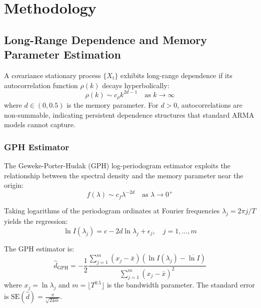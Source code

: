 \documentclass[12pt,a4paper]{article}
\begin{document}
\section{Methodology}
\label{sec:methodology}

\subsection{Long-Range Dependence and Memory Parameter Estimation}

A covariance stationary process $\{X_t\}$ exhibits long-range dependence if its autocorrelation function $\rho(k)$ decays hyperbolically:
\begin{equation}
    \rho(k) \sim c_\rho k^{2d-1} \quad \text{as } k \to \infty
\end{equation}
where $d \in (0, 0.5)$ is the memory parameter. For $d > 0$, autocorrelations are non-summable, indicating persistent dependence structures that standard ARMA models cannot capture.

\subsubsection{GPH Estimator}

The Geweke-Porter-Hudak (GPH) log-periodogram estimator \citep{geweke1983estimation} exploits the relationship between the spectral density and the memory parameter near the origin:
\begin{equation}
    f(\lambda) \sim c_f \lambda^{-2d} \quad \text{as } \lambda \to 0^+
\end{equation}

Taking logarithms of the periodogram ordinates at Fourier frequencies $\lambda_j = 2\pi j/T$ yields the regression:
\begin{equation}
    \ln I(\lambda_j) = c - 2d \ln \lambda_j + \epsilon_j, \quad j = 1, \ldots, m
\end{equation}

The GPH estimator is:
\begin{equation}
    \hat{d}_{\text{GPH}} = -\frac{1}{2} \frac{\sum_{j=1}^m (x_j - \bar{x})(\ln I(\lambda_j) - \overline{\ln I})}{\sum_{j=1}^m (x_j - \bar{x})^2}
\end{equation}
where $x_j = \ln \lambda_j$ and $m = \lfloor T^{0.5} \rfloor$ is the bandwidth parameter. The standard error is $\text{SE}(\hat{d}) = \frac{\pi}{\sqrt{24m}}$.
\end{document}
